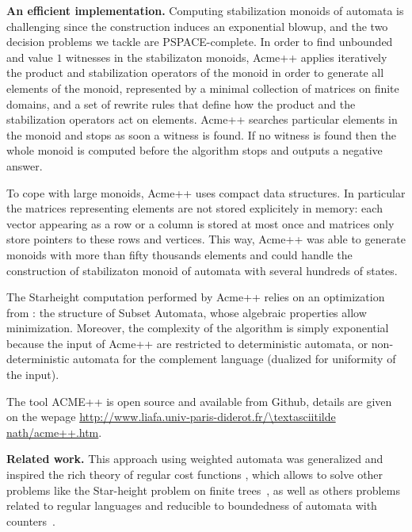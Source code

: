 \textbf{An efficient implementation.} Computing stabilization monoids of automata is challenging since the construction induces an exponential blowup, and the two decision problems we tackle are PSPACE-complete. In order to find unbounded and value $1$ witnesses in the stabilizaton monoids, Acme++
%
applies iteratively the product and stabilization operators of the monoid in order to generate all elements of the monoid, represented by a minimal collection of matrices on finite domains, and a set of rewrite rules that define how the product and the stabilization operators act on elements.
Acme++ searches particular elements in the monoid and stops as soon a witness is found. If no witness is found then the whole monoid is computed before the algorithm stops and outputs a negative answer.

To cope with large monoids, Acme++ uses compact data structures. In particular the matrices representing elements are not stored explicitely in memory: each vector appearing as a row or a column is stored at most once and matrices only store pointers to these rows and vertices. This way, Acme++ was able to generate monoids with more than fifty thousands elements and could handle the construction of stabilizaton monoid of automata with several hundreds of states.

The Starheight computation performed by Acme++ relies on an optimization from \cite{CL08sh}: the structure of Subset Automata, whose algebraic properties allow minimization. Moreover, the complexity of the algorithm is simply exponential because the input of Acme++ are restricted to deterministic automata, or non-deterministic automata for the complement language (dualized for uniformity of the input).

The tool ACME++ is open source and available from Github, details are given on the wepage
\url{http://www.liafa.univ-paris-diderot.fr/\textasciitilde nath/acme++.htm}.

\textbf{Related work.}
This approach using weighted automata was generalized and inspired the rich theory of regular cost functions \cite{Colcombet09}, which allows to solve other problems 
like the Star-height problem on finite trees~\cite{CL08sh}, as well as others problems related to regular languages and reducible to boundedness of automata with counters~\cite{CL08sh,CL08b,CKLB13}.



